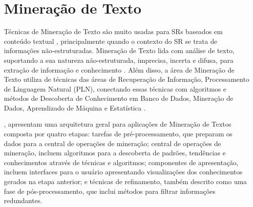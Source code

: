 \documentclass[normaltoc, espacoumemeio, pnumromarab,ruledheader]{abnt}
\begin{document}

        
\section{Mineração de Texto}
\label{sec:mintexto}

Técnicas de Mineração de Texto são muito usadas para SRs baseados em conteúdo textual \cite{Lops2011}, principalmente quando o contexto do SR se trata de informações não-estruturadas. Mineração de Texto lida com análise de texto, suportando a sua natureza não-estruturada, imprecisa, incerta e difusa, para extração de informação e conhecimento \cite{Hotho2005}.
Além disso, a área de Mineração de Texto utiliza de técnicas das áreas de Recuperação de Informação, Processamento de Linguagem Natural (PLN), conectando essas técnicas com algoritmos e métodos de Descoberta de Conhecimento em Banco de Dados, Mineração de Dados, Aprendizado de Máquina e Estatística \cite{Hotho2005}.


, apresentam uma arquitetura geral para aplicações de Mineração de Textos composta por quatro etapas: tarefas de pré-processamento, que preparam os dados para a central de operações de mineração; central de operações de mineração, incluem algoritmos para a descoberta de padrões, tendências e conhecimentos através de técnicas e algoritmos; componentes de apresentação, incluem interfaces para o usuário apresentando visualizações dos conhecimentos gerados na etapa anterior; e técnicas de refinamento, também descrito como uma fase de pós-processamento, que inclui métodos para filtrar informações redundantes.
\end{document}
